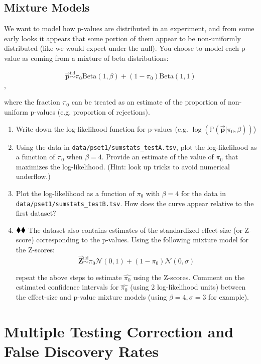 \documentclass{pset}
\begin{document}
\subsection*{Mixture Models}

We want to model how p-values are distributed in an experiment, and from some early looks it appears that some portion of them appear to be non-uniformly distributed (like we would expect under the null). You choose to model each p-value as coming from a mixture of beta distributions:

$$\overrightarrow{\mathbf{p}} \overset{\text{iid}}{\sim} \pi_0 \text{Beta}(1, \beta) + (1 - \pi_0)\text{Beta}(1,1)$$, 

where the fraction $\pi_0$ can be treated as an estimate of the proportion of non-uniform p-values (e.g. proportion of rejections).

\begin{enumerate}
\item Write down the log-likelihood function for p-values (e.g. $\log (\mathbb{P}(\overrightarrow{\mathbf{p}} | \pi_0, \beta))$)
\item Using the data in \texttt{data/pset1/sumstats\_testA.tsv}, plot the log-likelihood as a function of $\pi_0$ when $\beta = 4$. Provide an estimate of the value of $\pi_0$ that maximizes the log-likelihood. (Hint: look up tricks to avoid numerical underflow.)
\item Plot the log-likelihood as a function of $\pi_0$ with $\beta = 4$ for the data in \texttt{data/pset1/sumstats\_testB.tsv}. How does the curve appear relative to the first dataset?
\item $\mathbin{\blacklozenge}\mathbin{\blacklozenge}$ The dataset also contains estimates of the standardized effect-size (or Z-score) corresponding to the p-values. Using the following mixture model for the Z-scores: 
$$\overrightarrow{\mathbf{Z}} \overset{\text{iid}}{\sim} \pi_0 \mathcal{N}(0,1) + (1 - \pi_0)\mathcal{N}(0,\sigma)$$

repeat the above steps to estimate $\hat{\pi_0}$ using the Z-scores. Comment on the estimated confidence intervals for $\hat{\pi_0}$ (using 2 log-likelihood units) between the effect-size and p-value mixture models (using $\beta=4,\sigma=3$ for example).

\end{enumerate}

\section*{Multiple Testing Correction and False Discovery Rates}
\end{document}

